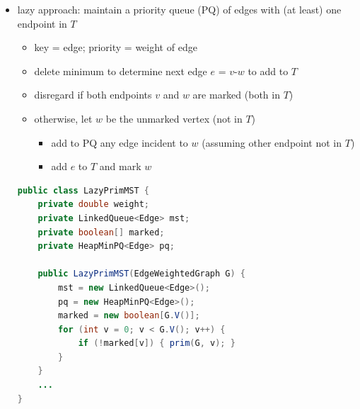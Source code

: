 \documentclass[8pt,a4paper,compress]{beamer}
\begin{document}
\begin{frame}[fragile]
\begin{itemize}
\item lazy approach: maintain a priority queue (PQ) of edges with (at least) one endpoint in $T$
\begin{itemize}
\item key = edge; priority = weight of edge

\item delete minimum to determine next edge $e$ = $v$-$w$ to add to $T$

\item disregard if both endpoints $v$ and $w$ are marked (both in $T$)

\item otherwise, let $w$ be the unmarked vertex (not in $T$)
\begin{itemize}
\item add to PQ any edge incident to $w$ (assuming other endpoint not in $T$)
\item add $e$ to $T$ and mark $w$
\end{itemize}
\end{itemize}

\begin{lstlisting}[language=Java]
public class LazyPrimMST {
    private double weight; 
    private LinkedQueue<Edge> mst; 
    private boolean[] marked; 
    private HeapMinPQ<Edge> pq; 

    public LazyPrimMST(EdgeWeightedGraph G) {
        mst = new LinkedQueue<Edge>();
        pq = new HeapMinPQ<Edge>();
        marked = new boolean[G.V()];
        for (int v = 0; v < G.V(); v++) {
            if (!marked[v]) { prim(G, v); }  
        }  
    }
    ...
}
\end{lstlisting}
\end{itemize}
\end{frame}
\end{document}

